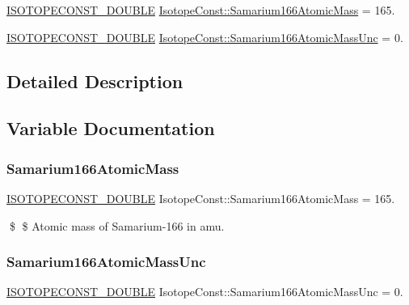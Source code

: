 \begin{DoxyCompactItemize}
\item 
\mbox{\hyperlink{group___isotope_const-_macros_ga8f45a7272ce02c0b4c65c44636ed719a}{I\+S\+O\+T\+O\+P\+E\+C\+O\+N\+S\+T\+\_\+\+D\+O\+U\+B\+LE}} \mbox{\hyperlink{group___isotope_const-_samarium-_sm166_ga8638e26990025cb02015fb7fa5abc417}{Isotope\+Const\+::\+Samarium166\+Atomic\+Mass}} = 165.
\item 
\mbox{\hyperlink{group___isotope_const-_macros_ga8f45a7272ce02c0b4c65c44636ed719a}{I\+S\+O\+T\+O\+P\+E\+C\+O\+N\+S\+T\+\_\+\+D\+O\+U\+B\+LE}} \mbox{\hyperlink{group___isotope_const-_samarium-_sm166_gac8cd1f807986f14baedb08c044d81d2a}{Isotope\+Const\+::\+Samarium166\+Atomic\+Mass\+Unc}} = 0.
\end{DoxyCompactItemize}


\subsection{Detailed Description}


\subsection{Variable Documentation}
\mbox{\label{group___isotope_const-_samarium-_sm166_ga8638e26990025cb02015fb7fa5abc417}} 
\subsubsection{\texorpdfstring{Samarium166\+Atomic\+Mass}{Samarium166AtomicMass}}
{\footnotesize\ttfamily \mbox{\hyperlink{group___isotope_const-_macros_ga8f45a7272ce02c0b4c65c44636ed719a}{I\+S\+O\+T\+O\+P\+E\+C\+O\+N\+S\+T\+\_\+\+D\+O\+U\+B\+LE}} Isotope\+Const\+::\+Samarium166\+Atomic\+Mass = 165.}

\$ \$ Atomic mass of Samarium-\/166 in amu. \mbox{\label{group___isotope_const-_samarium-_sm166_gac8cd1f807986f14baedb08c044d81d2a}} 
\subsubsection{\texorpdfstring{Samarium166\+Atomic\+Mass\+Unc}{Samarium166AtomicMassUnc}}
{\footnotesize\ttfamily \mbox{\hyperlink{group___isotope_const-_macros_ga8f45a7272ce02c0b4c65c44636ed719a}{I\+S\+O\+T\+O\+P\+E\+C\+O\+N\+S\+T\+\_\+\+D\+O\+U\+B\+LE}} Isotope\+Const\+::\+Samarium166\+Atomic\+Mass\+Unc = 0.}


